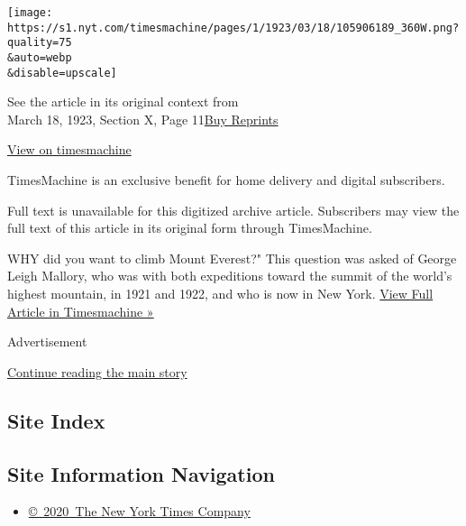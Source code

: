 \texttt{[image: https://s1.nyt.com/timesmachine/pages/1/1923/03/18/105906189\_360W.png?quality=75\\\&auto=webp\\\&disable=upscale]}

See the article in its original context from\\
March 18, 1923, Section X, Page
11\href{https://store.nytimes.com/collections/new-york-times-page-reprints?utm_source=nytimes\&utm_medium=article-page\&utm_campaign=reprints}{Buy
Reprints}

\href{http://timesmachine.nytimes.com/timesmachine/1923/03/18/105906189.html}{View
on timesmachine}

TimesMachine is an exclusive benefit for home delivery and digital
subscribers.

Full text is unavailable for this digitized archive article. Subscribers
may view the full text of this article in its original form through
TimesMachine.

WHY did you want to climb Mount Everest?" This question was asked of
George Leigh Mallory, who was with both expeditions toward the summit of
the world's highest mountain, in 1921 and 1922, and who is now in New
York.
\href{http://timesmachine.nytimes.com/timesmachine/1923/03/18/105906189.html}{View
Full Article in Timesmachine »}

Advertisement

\protect\hyperlink{after-bottom}{Continue reading the main story}

\hypertarget{site-index}{%
\subsection{Site Index}\label{site-index}}

\hypertarget{site-information-navigation}{%
\subsection{Site Information
Navigation}\label{site-information-navigation}}

\begin{itemize}
\tightlist
\item
  \href{https://help.nytimes.com/hc/en-us/articles/115014792127-Copyright-notice}{©~2020~The
  New York Times Company}
\end{itemize}

